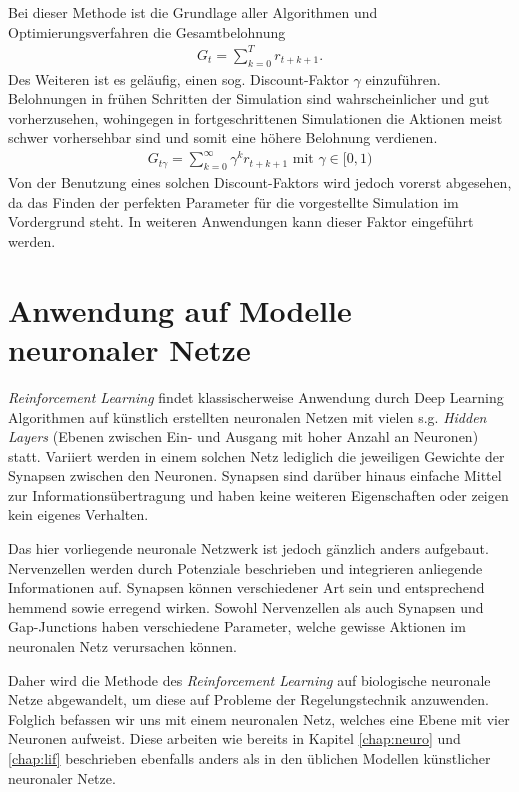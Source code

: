 	Bei dieser Methode ist die Grundlage aller Algorithmen und Optimierungsverfahren die Gesamtbelohnung
	\begin{align}
		G_t = \sum_{k=0}^{T}r_{t+k+1}.
	\end{align}
	Des Weiteren ist es geläufig, einen sog. \glqq Discount-Faktor\grqq{} $\gamma$ einzuführen. Belohnungen in frühen Schritten der Simulation sind wahrscheinlicher und gut vorherzusehen, wohingegen in fortgeschrittenen Simulationen die Aktionen meist schwer vorhersehbar sind und somit eine höhere Belohnung verdienen.
	\begin{align}
		G_{t\gamma} = \sum_{k=0}^{\infty}\gamma^k r_{t+k+1}\text{ mit }\gamma\in[0,1)
	\end{align}
	Von der Benutzung eines solchen Discount-Faktors wird jedoch vorerst abgesehen, da das Finden der perfekten Parameter für die vorgestellte Simulation im Vordergrund steht. In weiteren Anwendungen kann dieser Faktor eingeführt werden.
	
\section{Anwendung auf Modelle neuronaler Netze}
\label{sec:rl_neuro}
	\textit{Reinforcement Learning} findet klassischerweise Anwendung durch Deep Learning Algorithmen auf künstlich erstellten neuronalen Netzen mit vielen s.g. \textit{Hidden Layers} (Ebenen zwischen Ein- und Ausgang mit hoher Anzahl an Neuronen) statt. Variiert werden in einem solchen Netz lediglich die jeweiligen Gewichte der Synapsen zwischen den Neuronen. Synapsen sind darüber hinaus einfache Mittel zur Informationsübertragung und haben keine weiteren Eigenschaften oder zeigen kein eigenes Verhalten.
	
	Das hier vorliegende neuronale Netzwerk ist jedoch gänzlich anders aufgebaut. Nervenzellen werden durch Potenziale beschrieben und integrieren anliegende Informationen auf. Synapsen können verschiedener Art sein und entsprechend hemmend sowie erregend wirken. Sowohl Nervenzellen als auch Synapsen und Gap-Junctions haben verschiedene Parameter, welche gewisse Aktionen im neuronalen Netz verursachen können.
	
	Daher wird die Methode des \textit{Reinforcement Learning} auf biologische neuronale Netze abgewandelt, um diese auf Probleme der Regelungstechnik anzuwenden. Folglich befassen wir uns mit einem neuronalen Netz, welches eine Ebene mit vier Neuronen aufweist. Diese  arbeiten wie bereits in Kapitel \ref{chap:neuro} und \ref{chap:lif} beschrieben ebenfalls anders als in den üblichen Modellen künstlicher neuronaler Netze.
	
